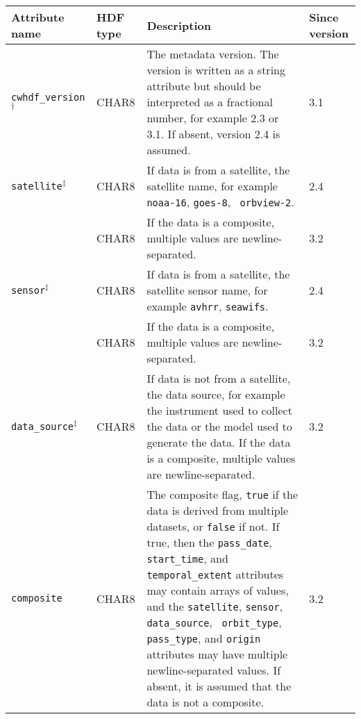 \begin{tabular}{|l|l|p{7.5cm}|l|}

  \hline

  Attribute name & HDF type & Description & Since version \\ \hline

  {\tt cwhdf\_version}$^{\dagger}$ & CHAR8 & The metadata version. The version
  is written as a string attribute but should be interpreted as a
  fractional number, for example 2.3 or 3.1. If absent, version 2.4 is
  assumed. & 3.1 \\ \hline

  {\tt satellite}$^{\ddagger}$ & CHAR8 & If data is from a satellite, the
  satellite name, for example {\tt noaa-16}, {\tt goes-8}, {\tt
  orbview-2}. & 2.4 \\ \hline

  & CHAR8 & If the data is a composite, multiple values are
  newline-separated. & 3.2 \\ \hline

  {\tt sensor}$^{\ddagger}$ & CHAR8 & If data is from a satellite, the
  satellite sensor name, for example {\tt avhrr}, {\tt seawifs}. & 2.4
  \\ \hline

  & CHAR8 & If the data is a composite, multiple values are
  newline-separated. & 3.2 \\ \hline

  {\tt data\_source}$^{\ddagger}$ & CHAR8 & If data is not from a
  satellite, the data source, for example the instrument used to
  collect the data or the model used to generate the data. If the data
  is a composite, multiple values are newline-separated. & 3.2 \\
  \hline

  {\tt composite} & CHAR8 & The composite flag, {\tt true} if the data
  is derived from multiple datasets, or {\tt false} if not. If true,
  then the {\tt pass\_date}, {\tt start\_time}, and {\tt
  temporal\_extent} attributes may contain arrays of values, and the
  {\tt satellite}, {\tt sensor}, {\tt data\_source}, {\tt
  orbit\_type}, {\tt pass\_type}, and {\tt origin} attributes may have
  multiple newline-separated values. If absent, it is assumed that the
  data is not a composite. & 3.2 \\ \hline

\end{tabular}

